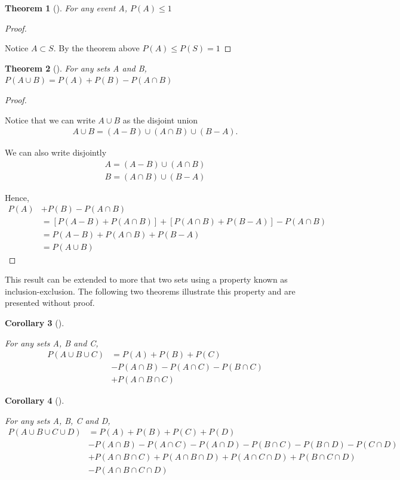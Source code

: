 \documentclass[10pt,]{book}
\theoremstyle{plain}
\newtheorem{theorem}{Theorem}[section]
\newtheorem{corollary}[theorem]{Corollary}
\theoremstyle{definition}
\theoremstyle{definition}
\theoremstyle{definition}
\numberwithin{equation}{section}
\begin{document}
\begin{theorem}[{}]\label{ProbabilityLessThanOne}
For any event A, \(P(A) \le 1\)\end{theorem}
\begin{proof}\hypertarget{proof-14}{}
Notice \(A \subset S\). By the theorem above \( P(A) \le P(S) = 1\)%
\end{proof}
\begin{theorem}[{}]\label{ProbabilityTwoUnions}
For any sets A and B, \(P(A \cup B) = P(A) + P(B) - P(A \cap B)\)\end{theorem}
\begin{proof}\hypertarget{proof-15}{}
Notice that we can write \(A \cup B\) as the disjoint union%
\begin{gather*}
A \cup B = (A-B) \cup (A \cap B) \cup (B-A).
\end{gather*}\par
We can also write disjointly%
\begin{gather*}
A = (A-B) \cup (A \cap B)\\
B = (A \cap B) \cup (B-A)
\end{gather*}\par
Hence, %
\begin{align*}
P(A) & + P(B) - P(A \cap B) \\
& = [P(A-B) + P(A \cap B)] + [P(A \cap B) + P(B-A)] - P(A \cap B)\\
& = P(A-B) + P(A \cap B) + P(B-A)\\
& = P(A \cup B)
\end{align*}\end{proof}
\par
This result can be extended to more that two sets using a property known as inclusion-exclusion. The
	following two theorems illustrate this property and are presented without proof.
\begin{corollary}[{}]\label{ProbabilityThreeUnions}

			For any sets A, B and C, 
			\begin{align*}
P(A \cup B \cup C) & = P(A) + P(B) + P(C)\\
& - P(A \cap B) - P(A \cap C) - P(B \cap C) \\
& + P(A \cap B \cap C)
\end{align*}\end{corollary}
\begin{corollary}[{}]\label{ProbabilityFourUnions}

			For any sets A, B, C and D, 
			\begin{align*}
P(A \cup B \cup C \cup D) & = P(A) + P(B) + P(C) + P(D)\\
& - P(A \cap B) - P(A \cap C) - P(A \cap D)  - P(B \cap C) - P(B \cap D) - P(C \cap D)\\
& + P(A \cap B \cap C) + P(A \cap B \cap D) + P(A \cap C \cap D) + P(B \cap C \cap D)\\
& - P(A \cap B \cap C \cap D)
\end{align*}\end{corollary}
\par
\end{document}
